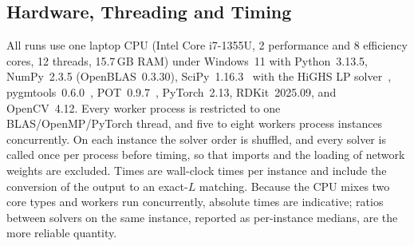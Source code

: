 \documentclass[conference]{IEEEtran}
\begin{document}
\subsection{Hardware, Threading and Timing}
All runs use one laptop CPU (Intel Core i7-1355U, 2 performance and 8 efficiency cores, 12 threads, 15.7\,GB RAM) under Windows~11 with Python~3.13.5, NumPy~2.3.5 (OpenBLAS~0.3.30), SciPy~1.16.3~\cite{virtanen2020scipy} with the HiGHS LP solver~\cite{huangfu2018highs}, pygmtools~0.6.0~\cite{wang2024pygmtools}, POT~0.9.7~\cite{flamary2021pot}, PyTorch~2.13, RDKit~2025.09, and OpenCV~4.12. Every worker process is restricted to one BLAS/OpenMP/PyTorch thread, and five to eight workers process instances concurrently. On each instance the solver order is shuffled, and every solver is called once per process before timing, so that imports and the loading of network weights are excluded. Times are wall-clock times per instance and include the conversion of the output to an exact-$L$ matching. Because the CPU mixes two core types and workers run concurrently, absolute times are indicative; ratios between solvers on the same instance, reported as per-instance medians, are the more reliable quantity.
\end{document}
